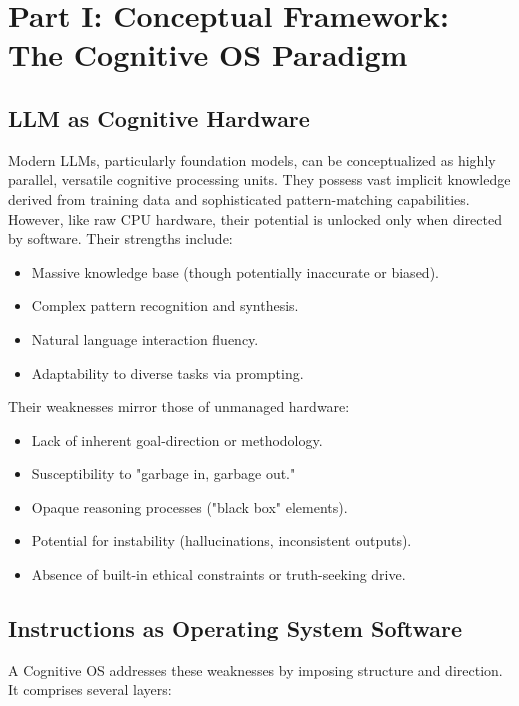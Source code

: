 \documentclass[11pt,a4paper]{article}
\theoremstyle{definition}
\theoremstyle{remark}
\begin{document}
\section{Part I: Conceptual Framework: The Cognitive OS Paradigm}

\subsection{LLM as Cognitive Hardware}

Modern LLMs, particularly foundation models, can be conceptualized as highly parallel, versatile cognitive processing units. They possess vast implicit knowledge derived from training data and sophisticated pattern-matching capabilities. However, like raw CPU hardware, their potential is unlocked only when directed by software. Their strengths include:
\begin{itemize}
    \item Massive knowledge base (though potentially inaccurate or biased).
    \item Complex pattern recognition and synthesis.
    \item Natural language interaction fluency.
    \item Adaptability to diverse tasks via prompting.
\end{itemize}
Their weaknesses mirror those of unmanaged hardware:
\begin{itemize}
    \item Lack of inherent goal-direction or methodology.
    \item Susceptibility to "garbage in, garbage out."
    \item Opaque reasoning processes ("black box" elements).
    \item Potential for instability (hallucinations, inconsistent outputs).
    \item Absence of built-in ethical constraints or truth-seeking drive.
\end{itemize}

\subsection{Instructions as Operating System Software}

A Cognitive OS addresses these weaknesses by imposing structure and direction. It comprises several layers:
\end{document}
